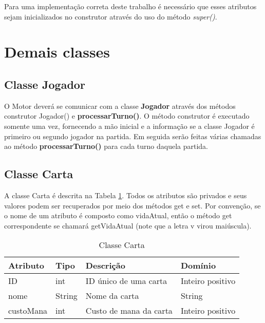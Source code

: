 \documentclass[10pt]{article}
\begin{document}
Para uma implementação correta deste trabalho é necessário que esses atributos sejam inicializados no construtor através do uso do método \textit{super()}.

\section{Demais classes}

\subsection{Classe Jogador}

O Motor deverá se comunicar com a classe \textbf{Jogador} através dos métodos construtor Jogador() e \textbf{processarTurno()}. O método construtor é executado somente uma vez, fornecendo a mão inicial e a informação se a classe Jogador é primeiro ou segundo jogador na partida. Em seguida serão feitas várias chamadas ao método \textbf{processarTurno()} para cada turno daquela partida.

\subsection{Classe Carta}

A classe Carta é descrita na Tabela \ref{tab:carta}. Todos os atributos são privados e seus valores podem ser recuperados por meio dos métodos get e set. Por convenção, se o nome de um atributo é composto como vidaAtual, então o método get correspondente se chamará getVidaAtual (note que a letra v virou maiúscula).




\renewcommand{\arraystretch}{1.15}
\begin{table}[h]
\centering
\caption{Classe Carta}
\label{tab:carta}
\begin{tabular}{|l|l|p{5cm}|p{4cm}|}
\hline
Atributo & Tipo & Descrição & Domínio \\ \hline
ID       & int       & ID único de uma carta         & Inteiro positivo                 \\ \hline
nome     & String    & Nome da carta        & String                \\ \hline
custoMana  & int     & Custo de mana da carta        & Inteiro positivo              \\ \hline
\end{tabular}
\end{table}
\end{document}
